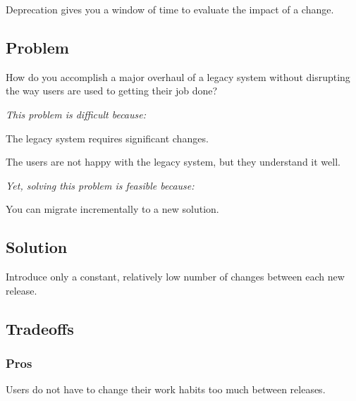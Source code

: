 \documentclass[a4paper,10pt,twoside]{book}
\begin{document}
Deprecation gives you a window of time to evaluate the impact of a change.




\subsection*{Problem}

How do you accomplish a major overhaul of a legacy system without disrupting the way users are used to getting their job done?

\emph{This problem is difficult because:} 

\begin{bulletlist}
\item The legacy system requires significant changes.

\item The users are not happy with the legacy system, but they understand it well.
\end{bulletlist}

\emph{Yet, solving this problem is feasible because:}

\begin{bulletlist}
\item You can migrate incrementally to a new solution.
\end{bulletlist}

\subsection*{Solution}

Introduce only a constant, relatively low number of changes between each new release.

\subsection*{Tradeoffs}

\subsubsection*{Pros}

\begin{bulletlist}
\item Users do not have to change their work habits too much between releases.
\end{bulletlist}
\end{document}
